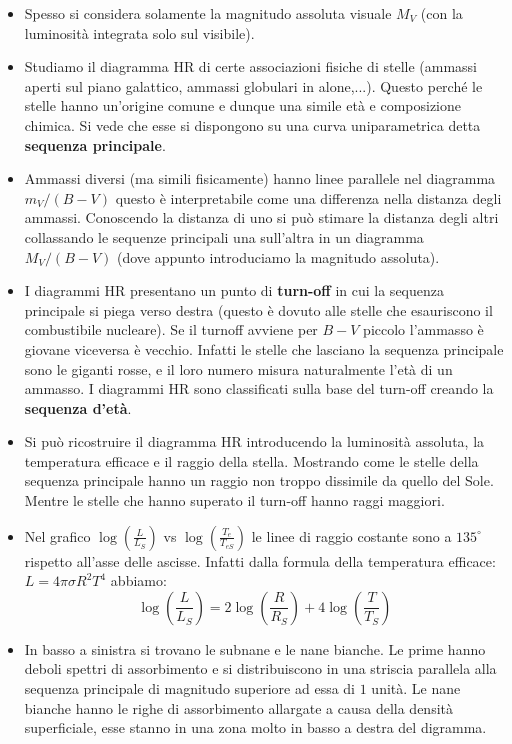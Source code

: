 \documentclass[11pt,a4paper]{article}
\begin{document}
\begin{itemize}
\item Spesso si considera solamente la magnitudo assoluta visuale $M_V$ (con la luminosità integrata solo sul visibile).

\item Studiamo il diagramma HR di certe associazioni fisiche di stelle (ammassi aperti sul piano galattico, ammassi globulari
in alone,...). Questo perché le stelle hanno un'origine comune e dunque una simile età e composizione chimica.
Si vede che esse si dispongono su una curva uniparametrica detta \textbf{sequenza principale}.

\item Ammassi diversi (ma simili fisicamente) hanno linee parallele nel diagramma $m_V/(B-V)$ questo è interpretabile come una differenza nella distanza degli ammassi. Conoscendo la distanza di uno si può stimare la distanza degli altri collassando le sequenze principali una sull'altra in un diagramma $M_V/(B-V)$ (dove appunto introduciamo la magnitudo assoluta).

\item I diagrammi HR presentano un punto di \textbf{turn-off} in cui la sequenza principale si piega verso destra (questo è dovuto alle stelle che esauriscono il combustibile nucleare). Se il turnoff avviene per $B-V$ piccolo l'ammasso è giovane viceversa è vecchio. Infatti le stelle che lasciano la sequenza principale sono le giganti rosse, e il loro numero misura naturalmente l'età di un ammasso.
I diagrammi HR sono classificati sulla base del turn-off creando la \textbf{sequenza d'età}.

\item Si può ricostruire il diagramma HR introducendo la luminosità assoluta, la temperatura efficace e il raggio della stella. Mostrando come le stelle della sequenza principale hanno un raggio non troppo dissimile da quello del Sole. Mentre le stelle che hanno superato il turn-off hanno raggi maggiori.

\item Nel grafico $\log \left( \frac{L}{L_S} \right)$ vs $\log \left( \frac{T_e}{T_{eS}} \right)$ le linee di raggio costante sono a $135^{\circ} $ rispetto all'asse delle ascisse. Infatti dalla formula della temperatura efficace: $L = 4 \pi \sigma R^2 T^4$ abbiamo:
\begin{equation}
\log \left( \frac{L}{L_S} \right) = 2 \log \left( \frac{R}{R_S} \right)+4\log \left( \frac{T}{T_S} \right)
\end{equation}

\item In basso a sinistra si trovano le subnane e le nane bianche. Le prime hanno deboli spettri di assorbimento e si distribuiscono in una striscia parallela alla sequenza principale di magnitudo superiore ad essa di $1$ unità. Le nane bianche hanno le righe di assorbimento allargate a causa della densità superficiale, esse stanno in una zona molto in basso a destra del digramma.


\end{itemize}
\end{document}
